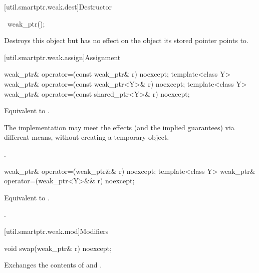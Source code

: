 [util.smartptr.weak.dest]{Destructor}

\begin{indexed}{}
\begin{itemdecl}
~weak_ptr();
\end{itemdecl}
\end{indexed}

\begin{itemdescr}
\pnum
\effects
Destroys this  object but has no
effect on the object its stored pointer points to.
\end{itemdescr}

[util.smartptr.weak.assign]{Assignment}

%
\begin{itemdecl}
weak_ptr& operator=(const weak_ptr& r) noexcept;
template<class Y> weak_ptr& operator=(const weak_ptr<Y>& r) noexcept;
template<class Y> weak_ptr& operator=(const shared_ptr<Y>& r) noexcept;
\end{itemdecl}

\begin{itemdescr}
\pnum
\effects
Equivalent to .

\pnum
\remarks
The implementation may meet the effects (and the
implied guarantees) via different means, without creating a temporary object.

\pnum
\returns
{}.
\end{itemdescr}

%
\begin{itemdecl}
weak_ptr& operator=(weak_ptr&& r) noexcept;
template<class Y> weak_ptr& operator=(weak_ptr<Y>&& r) noexcept;
\end{itemdecl}

\begin{itemdescr}
\pnum
\effects
Equivalent to .

\pnum
\returns
{}.
\end{itemdescr}

[util.smartptr.weak.mod]{Modifiers}
%
\begin{itemdecl}
void swap(weak_ptr& r) noexcept;
\end{itemdecl}

\begin{itemdescr}
\pnum
\effects
Exchanges the contents of  and .
\end{itemdescr}


